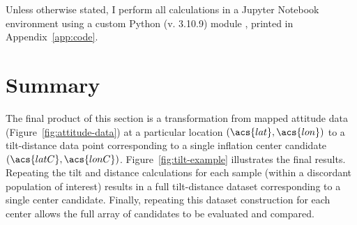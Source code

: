 Unless otherwise stated, I perform all calculations in a Jupyter Notebook environment using a custom Python (v. 3.10.9) module , printed in Appendix~\ref{app:code}.







\section{Summary}

The final product of this section is a transformation from mapped attitude data (Figure~\ref{fig:attitude-data}) at a particular location $(\acs{lat}, \acs{lon})$ to a tilt-distance data point corresponding to a single inflation center candidate $(\acs{latC}, \acs{lonC})$. Figure~\ref{fig:tilt-example} illustrates the final results. Repeating the tilt and distance calculations for each sample (within a discordant population of interest) results in a full tilt-distance dataset corresponding to a single center candidate. Finally, repeating this dataset construction for each center allows the full array of candidates to be evaluated and compared.